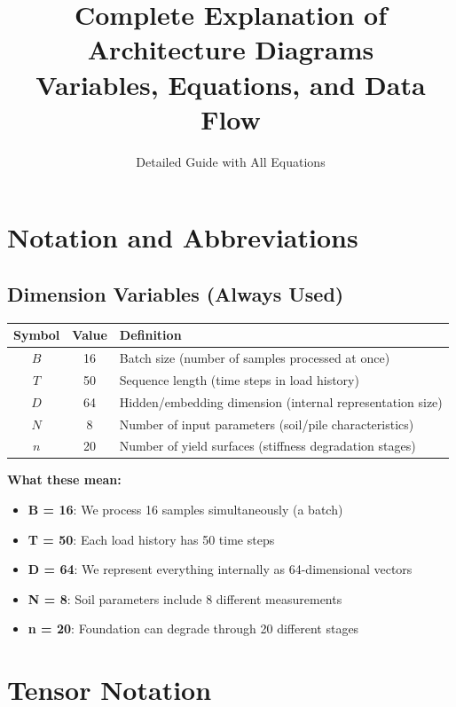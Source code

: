 \documentclass[11pt,a4paper]{article}
\title{Complete Explanation of Architecture Diagrams\\Variables, Equations, and Data Flow}
\author{Detailed Guide with All Equations}
\date{}
\begin{document}
\maketitle
\tableofcontents
\newpage

\section{Notation and Abbreviations}

\subsection{Dimension Variables (Always Used)}

\begin{table}[H]
\centering
\begin{tabular}{|c|c|l|}
\hline
\textbf{Symbol} & \textbf{Value} & \textbf{Definition} \\
\hline
$B$ & 16 & Batch size (number of samples processed at once) \\
\hline
$T$ & 50 & Sequence length (time steps in load history) \\
\hline
$D$ & 64 & Hidden/embedding dimension (internal representation size) \\
\hline
$N$ & 8 & Number of input parameters (soil/pile characteristics) \\
\hline
$n$ & 20 & Number of yield surfaces (stiffness degradation stages) \\
\hline
\end{tabular}
\end{table}

\textbf{What these mean:}

\begin{itemize}
  \item \textbf{B = 16}: We process 16 samples simultaneously (a batch)
  \item \textbf{T = 50}: Each load history has 50 time steps
  \item \textbf{D = 64}: We represent everything internally as 64-dimensional vectors
  \item \textbf{N = 8}: Soil parameters include 8 different measurements
  \item \textbf{n = 20}: Foundation can degrade through 20 different stages
\end{itemize}

\section{Tensor Notation}
\end{document}
